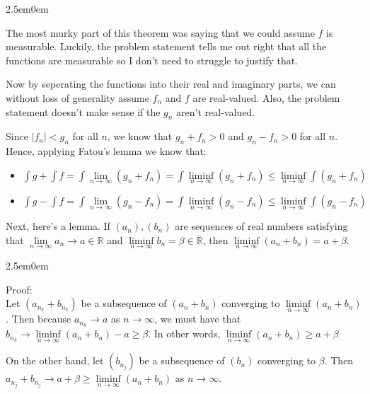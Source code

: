 \documentclass{book}
\newcommand{\exTwoP}{%
   \color{RedViolet}%
   \fontsize{13}{15}\selectfont%
}
\newcommand{\exPPP}{%
   \color{VioletRed}%
   \fontsize{12}{14}\selectfont%
}
\newenvironment{myIndent}{%
   \begin{adjustwidth}{2.5em}{0em}%
}{%
   \end{adjustwidth}%
}
\newcommand{\retTwo}{\hfill\bigbreak}
\begin{document}
\begin{myIndent}\exTwoP
   The most murky part of this theorem was saying that we could assume $f$ is\\ measurable. Luckily, the problem statement tells me out right that all the\\ functions are measurable so I don't need to struggle to justify that.\retTwo

	Now by seperating the functions into their real and imaginary parts, we can without loss of generality assume $f_n$ and $f$ are real-valued. Also, the problem statement doesn't make sense if the $g_n$ aren't real-valued.\retTwo

	Since $|f_n| < g_n$ for all $n$, we know that $g_n + f_n > 0$ and $g_n - f_n > 0$ for all $n$. Hence, applying Fatou's lemma we know that:

	\begin{itemize}
		\item $\int g + \int f = \int \lim\limits_{n \rightarrow \infty} (g_n + f_n) = \int \liminf\limits_{n \rightarrow \infty} (g_n + f_n) \leq \liminf\limits_{n \rightarrow \infty}\int (g_n + f_n)$
		\item $\int g - \int f = \int \lim\limits_{n \rightarrow \infty} (g_n - f_n) = \int \liminf\limits_{n \rightarrow \infty} (g_n - f_n) \leq \liminf\limits_{n \rightarrow \infty}\int (g_n - f_n)$\retTwo
	\end{itemize}



	Next, here's a lemma. If $(a_n), (b_n)$ are sequences of real numbers satisfying that $\lim\limits_{n \rightarrow \infty}a_n \rightarrow a \in \mathbb{R}$ and $\liminf\limits_{n\rightarrow \infty} b_n = \beta \in \overline{\mathbb{R}}$, then $\liminf\limits_{n \rightarrow \infty}(a_n + b_n) = a + \beta$.

	\begin{myIndent}\exPPP
		Proof:\\
		Let $(a_{n_k} + b_{n_k})$ be a subsequence of $(a_n + b_n)$ converging to $\liminf\limits_{n \rightarrow \infty}(a_n + b_n)$. Then because $a_{n_k} \rightarrow a$ as $n \rightarrow \infty$, we must have that $b_{n_k} \rightarrow \liminf\limits_{n \rightarrow \infty}(a_n + b_n) - a \geq \beta$. In other words, $\liminf\limits_{n \rightarrow \infty}(a_n + b_n) \geq a + \beta$\retTwo
		
		On the other hand, let $(b_{n_j})$ be a subsequence of $(b_n)$ converging to $\beta$. Then\\ $a_{n_j} + b_{n_j} \rightarrow a + \beta \geq \liminf\limits_{n \rightarrow \infty}(a_n + b_n)$ as $n \rightarrow \infty$.\retTwo
	\end{myIndent}


\end{myIndent}
\end{document}
